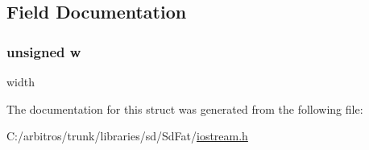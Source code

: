 \subsection{Field Documentation}
\hypertarget{structsetw_aab2ee9ec393223c855b9595e52382ac0}{
\subsubsection[{w}]{\setlength{\rightskip}{0pt plus 5cm}unsigned w}}\label{structsetw_aab2ee9ec393223c855b9595e52382ac0}
width 

The documentation for this struct was generated from the following file\-:\begin{DoxyCompactItemize}
\item 
C\-:/arbitros/trunk/libraries/sd/\-Sd\-Fat/\hyperlink{iostream_8h}{iostream.\-h}\end{DoxyCompactItemize}
